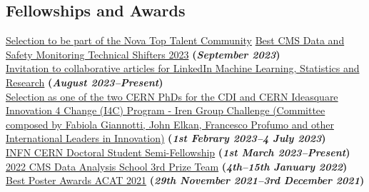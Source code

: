 \documentclass[11pt]{res}
\newcommand{\MarginText}[1]{\section{#1}\vspace{10pt}}
\begin{document}
\begin{resume}
\MarginText{Fellowships and Awards}
\href{https://digital-agent.novatalent.net/open/certificate/1OBEUZCU6M7ZHHROVP0F8870F}{Selection to be part of the Nova Top Talent Community}
\href{https://www.linkedin.com/feed/update/urn:li:activity:7121188105495171073/}{Best CMS Data and Safety Monitoring Technical Shifters 2023} \textbf{(\textit{September 2023})}\\
\href{https://www.linkedin.com/advice/1/how-do-you-avoid-bias-machine-learning-imbalanced}{Invitation to collaborative articles for LinkedIn Machine Learning, Statistics and Research} \textbf{(\textit{August 2023--Present})}\\
\href{https://www.repubblica.it/tecnologia/2023/07/06/news/innovation_4_change__industry_leaders_summit_cern_di_ginevra-406876410/}{Selection as one of the two CERN PhDs for the CDI and CERN Ideasquare Innovation 4 Change (I4C) Program - Iren Group Challenge (Committee composed by Fabiola Giannotti, John Elkan, Francesco Profumo and other International Leaders in Innovation)} \textbf{(\textit{1st Febrary 2023--4 July 2023})}\\
\href{https://drive.google.com/file/d/1gvGcpn9FgzyjUBVwmCCa8zAbnvYefJAa/view?usp=share_link}{INFN CERN Doctoral Student Semi-Fellowship} \textbf{(\textit{1st March 2023--Present})}\\
\href{https://indico.cern.ch/event/1088671/}{2022 CMS Data Analysis School 3rd Prize Team} \textbf{(\textit{4th--15th January 2022})}\\
\href{https://indico.cern.ch/event/855454/contributions/4596351/}{Best Poster Awards ACAT 2021} \textbf{(\textit{29th November 2021--3rd December 2021})}\\

\end{resume}
\end{document}
